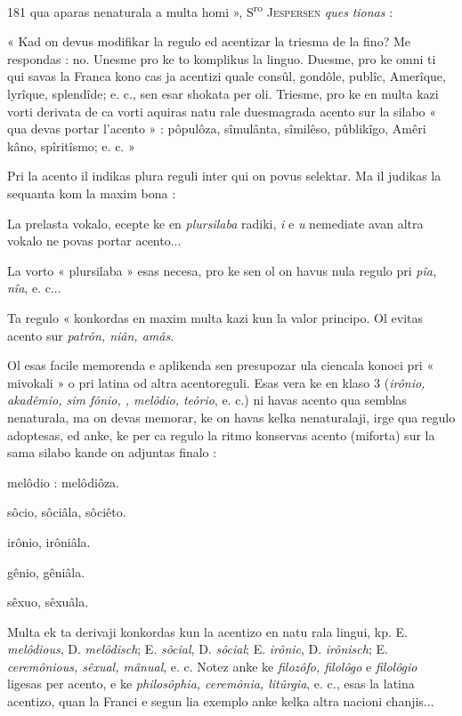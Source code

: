 \begin{VUpage}[185]{181}
\VUcontinue
qua aparas nenaturala a multa homi », S\textsuperscript{ro} \textsc{Jespersen} \textit{ques}\cc
\textit{tionas} :

« Kad on devus modifikar la regulo ed acentizar la triesma\nl
de la fino? Me respondas : no. Unesme pro ke to komplikus\nl
la linguo. Duesme, pro ke omni ti qui savas la Franca kono\cc
cas ja acentizi quale consûl, gondôle, publîc, Amerîque,\nl
lyrîque, splendîde; e. c., sen esar shokata per oli. Triesme,\nl
pro ke en multa kazi vorti derivata de ca vorti aquiras natu\cc
rale duesmagrada acento sur la silabo « qua devas portar\nl
l'acento » : pôpulôza, sîmulânta, sîmilêso, pûblikîgo, Amêri\cc
kâno, spîritîsmo; e. c. »

Pri la acento il indikas plura reguli inter qui on povus\nl
selektar. Ma il judikas la sequanta kom la maxim bona :

La prelasta vokalo, ecepte ke en \textit{plursilaba} radiki, \textit{i} e \textit{u}\nl
nemediate avan altra vokalo ne povas portar acento...

La vorto « plursilaba » esas necesa, pro ke sen ol on\nl
havus nula regulo pri \textit{pîa, nîa}, e. c...

Ta regulo « konkordas en maxim multa kazi kun la valor\cc
principo. Ol evitas acento sur \textit{patrôn, niân, amâs}.

Ol esas facile memorenda e aplikenda sen presupozar ula\nl
ciencala konoci pri « mivokali » o pri latina od altra\nl
acentoreguli. Esas vera ke en klaso 3 (\textit{irônio, akadêmio, sim}\cc
\textit{fônio, , melôdio, teôrio}, e. c.) ni havas acento qua\nl
semblas nenaturala, ma on devas memorar, ke on havas\nl
kelka nenaturalaji, irge qua regulo adoptesas, ed anke, ke\nl
per ca regulo la ritmo konservas acento (miforta) sur la\nl
sama silabo kande on adjuntas finalo :

melôdio : melôdiôza.

sôcio, sôciâla, sôciêto.

irônio, irôniâla.

gênio, gêniâla.

sêxuo, sêxuâla.

Multa ek ta derivaji konkordas kun la acentizo en natu\cc
rala lingui, kp. E. \textit{melôdious}, D. \textit{melôdisch}; E. \textit{sôcial}, D.\nl
\textit{sôcial}; E. \textit{irônic}, D. \textit{irônisch}; E. \textit{ceremônious, sêxual, mânual},\nl
e. c. Notez anke ke \textit{filozôfo, filolôgo} e \textit{filolôgio} ligesas per\nl
acento, e ke \textit{philosôphia, ceremônia, litûrgia}, e. c., esas la\nl
latina acentizo, quan la Franci e segun lia exemplo anke\nl
kelka altra nacioni chanjis...
\end{VUpage}

